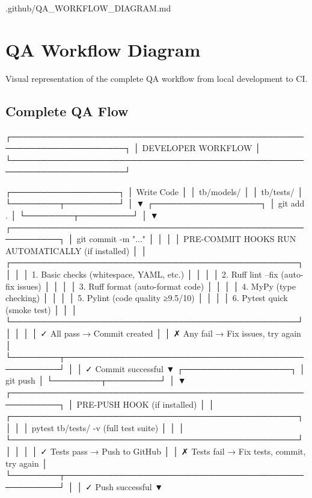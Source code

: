 \begin{relocated}{.github/QA_WORKFLOW_DIAGRAM.md}
\section{QA Workflow Diagram}\label{um:flow:qa-workflow-diagram}

Visual representation of the complete QA workflow from local development
to CI.

\subsection{Complete QA Flow}\label{um:flow:qa-workflow-diagram:complete-qa-flow}

\begin{logblock}
┌─────────────────────────────────────────────────────────────────────┐
│                         DEVELOPER WORKFLOW                          │
└─────────────────────────────────────────────────────────────────────┘

    ┌──────────────────┐
    │  Write Code      │
    │  tb/models/      │
    │  tb/tests/       │
    └────────┬─────────┘
             │
             ▼
    ┌──────────────────┐
    │  git add .       │
    └────────┬─────────┘
             │
             ▼
    ┌──────────────────────────────────────────────────────────┐
    │                    git commit -m "..."                   │
    │                                                          │
    │  PRE-COMMIT HOOKS RUN AUTOMATICALLY (if installed)       │
    │  ┌────────────────────────────────────────────────┐    │
    │  │ 1. Basic checks (whitespace, YAML, etc.)       │    │
    │  │ 2. Ruff lint --fix (auto-fix issues)           │    │
    │  │ 3. Ruff format (auto-format code)              │    │
    │  │ 4. MyPy (type checking)                        │    │
    │  │ 5. Pylint (code quality ≥9.5/10)               │    │
    │  │ 6. Pytest quick (smoke test)                   │    │
    │  └────────────────────────────────────────────────┘    │
    │                                                          │
    │  ✓ All pass → Commit created                            │
    │  ✗ Any fail → Fix issues, try again                     │
    └────────┬─────────────────────────────────────────────────┘
             │
             │ ✓ Commit successful
             ▼
    ┌──────────────────┐
    │  git push        │
    └────────┬─────────┘
             │
             ▼
    ┌──────────────────────────────────────────────────────────┐
    │              PRE-PUSH HOOK (if installed)                │
    │  ┌────────────────────────────────────────────────┐    │
    │  │ pytest tb/tests/ -v (full test suite)          │    │
    │  └────────────────────────────────────────────────┘    │
    │                                                          │
    │  ✓ Tests pass → Push to GitHub                          │
    │  ✗ Tests fail → Fix tests, commit, try again            │
    └────────┬─────────────────────────────────────────────────┘
             │
             │ ✓ Push successful
             ▼


\end{logblock}
\end{relocated}
